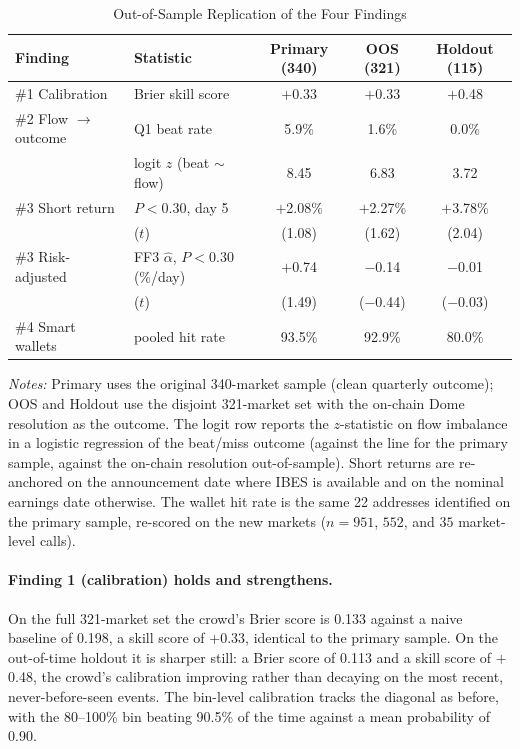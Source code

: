 \documentclass[11pt]{article}
\begin{document}
\begin{table}[htbp]
\centering
\begin{threeparttable}
\caption{Out-of-Sample Replication of the Four Findings}
\label{tab:oos}
\begin{tabular}{llccc}
\toprule
Finding & Statistic & Primary (340) & OOS (321) & Holdout (115) \\
\midrule
\#1 Calibration & Brier skill score & $+$0.33 & $+$0.33 & $+$0.48 \\
\#2 Flow $\to$ outcome & Q1 beat rate & 5.9\% & 1.6\% & 0.0\% \\
 & logit $z$ (beat $\sim$ flow) & 8.45 & 6.83 & 3.72 \\
\#3 Short return & $P<0.30$, day 5 & $+$2.08\% & $+$2.27\% & $+$3.78\% \\
 & \quad ($t$) & (1.08) & (1.62) & (2.04) \\
\#3 Risk-adjusted & FF3 $\hat\alpha$, $P<0.30$ (\%/day) & $+$0.74 & $-$0.14 & $-$0.01 \\
 & \quad ($t$) & (1.49) & ($-$0.44) & ($-$0.03) \\
\#4 Smart wallets & pooled hit rate & 93.5\% & 92.9\% & 80.0\% \\
\bottomrule
\end{tabular}
\begin{tablenotes}
\small
\item \textit{Notes:} Primary uses the original 340-market sample (clean quarterly outcome); OOS and Holdout use the disjoint 321-market set with the on-chain Dome resolution as the outcome. The logit row reports the $z$-statistic on flow imbalance in a logistic regression of the beat/miss outcome (against the line for the primary sample, against the on-chain resolution out-of-sample). Short returns are re-anchored on the announcement date where IBES is available and on the nominal earnings date otherwise. The wallet hit rate is the same 22 addresses identified on the primary sample, re-scored on the new markets ($n = 951$, $552$, and $35$ market-level calls).
\end{tablenotes}
\end{threeparttable}
\end{table}

\paragraph{Finding 1 (calibration) holds and strengthens.} On the full 321-market set the crowd's Brier score is 0.133 against a naive baseline of 0.198, a skill score of $+$0.33, identical to the primary sample. On the out-of-time holdout it is sharper still: a Brier score of 0.113 and a skill score of $+$0.48, the crowd's calibration improving rather than decaying on the most recent, never-before-seen events. The bin-level calibration tracks the diagonal as before, with the 80--100\% bin beating 90.5\% of the time against a mean probability of 0.90.
\end{document}
